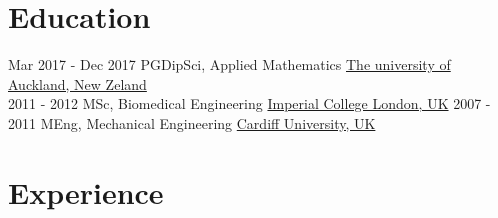 \documentclass[letterpaper]{twentysecondcv} %
\begin{document}
\makeprofile %

\section{Education}

\begin{twenty} %
	\twentyitem
    	{Mar 2017 -}
        {Dec 2017}
        {PGDipSci, Applied Mathematics}
        {\href{https://www.auckland.ac.nz/en.html}{The university of Auckland, New Zeland}}
        {}
        {}
    \\
	\twentyitem
    	{2011 - 2012}
		{}
        {MSc, Biomedical Engineering}
        {\href{https://www.imperial.ac.uk/}{Imperial College London, UK}}
        {}
        {}
    \twentyitem
    	{2007 - 2011}
		{}
        {MEng, Mechanical Engineering}
        {\href{https://www.cardiff.ac.uk/}{Cardiff University, UK}}
        {}
        {}
\end{twenty}


\section{Experience}
\end{document}
